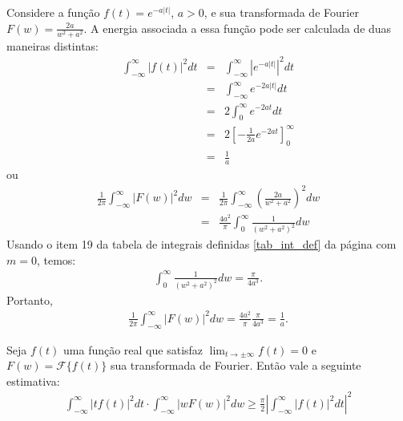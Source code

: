 \begin{ex}Considere a função $f(t)=e^{-a|t|}$, $a>0$, e sua transformada de Fourier $F(w)=\frac{2a}{w^2+a^2}$. A energia associada a essa função pode ser calculada de duas maneiras distintas:
\begin{eqnarray*}
\int_{-\infty}^\infty |f(t)|^2dt&=&\int_{-\infty}^\infty |e^{-a|t|}|^2dt\\
&=&\int_{-\infty}^\infty e^{-2a|t|}dt\\
&=&2\int_{0}^\infty e^{-2a t}dt\\
&=&2\left[-\frac{1}{2a} e^{-2a t}\right]_{0}^\infty\\
&=&\frac{1}{a}
\end{eqnarray*}
ou
\begin{eqnarray*}
\frac{1}{2\pi}\int_{-\infty}^\infty |F(w)|^2dw&=&\frac{1}{2\pi}\int_{-\infty}^\infty \left(\frac{2a}{w^2+a^2}\right)^2dw\\
&=&\frac{4a^2}{\pi}\int_{0}^\infty \frac{1}{\left(w^2+a^2\right)^2}dw
\end{eqnarray*}
Usando o item 19 da tabela de integrais definidas \ref{tab_int_def} da página \pageref{tab_int_def} com $m=0$, temos:
\begin{eqnarray*}
\int_{0}^\infty \frac{1}{\left(w^2+a^2\right)^2}dw=\frac{\pi}{4a^3}.
\end{eqnarray*}
Portanto,
\begin{eqnarray*}
\frac{1}{2\pi}\int_{-\infty}^\infty |F(w)|^2dw=\frac{4a^2}{\pi}\frac{\pi}{4a^3}=\frac{1}{a}.
\end{eqnarray*}
\end{ex}
\begin{teo}\label{prop_princ_incert} Seja $f(t)$ uma função real que satisfaz $\lim_{t\to\pm\infty}f(t)=0$ e $F(w)=\mathcal{F}\{f(t)\}$ sua transformada de Fourier. Então vale a seguinte estimativa:
\begin{eqnarray*}
\int_{-\infty}^\infty  | tf(t)|^2dt\cdot \int_{-\infty}^\infty \left|w F(w)\right|^2dw\geq \frac{\pi}{2}
\left|\int_{-\infty}^\infty |f(t)|^2dt\right|^2 
\end{eqnarray*}
\end{teo}

